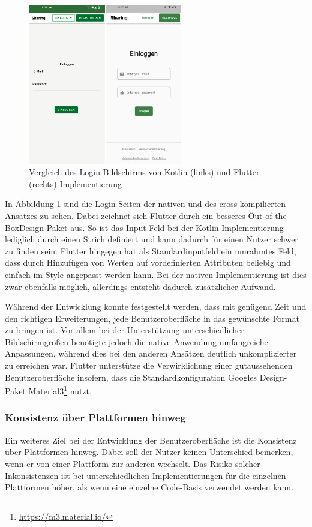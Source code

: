 \begin{figure}[ht]
  \centering
  \includegraphics[height=7cm,keepaspectratio]{images/Login_vergleich.png} 
  \caption[Vergleich des Login-Bildschirms von Kotlin und Flutter Implementierung.]{Vergleich des Login-Bildschirms von Kotlin (links) und Flutter (rechts) Implementierung}
  \label{fig:loginscreen}
\end{figure}

In Abbildung \ref{fig:loginscreen} sind die Login-Seiten der nativen und des cross-kompilierten Ansatzes zu sehen. Dabei zeichnet sich Flutter durch ein besseres \"Out-of-the-Box\" Design-Paket aus. So ist das Input Feld bei der Kotlin Implementierung lediglich durch einen Strich definiert und kann dadurch für einen Nutzer schwer zu finden sein. Flutter hingegen hat als Standardinputfeld ein umrahmtes Feld, dass durch Hinzufügen von Werten auf vordefinierten Attributen beliebig und einfach im Style angepasst werden kann. Bei der nativen Implementierung ist dies zwar ebenfalls möglich, allerdings entsteht dadurch zusätzlicher Aufwand.

Während der Entwicklung konnte festgestellt werden, dass mit genügend Zeit und den richtigen Erweiterungen, jede Benutzeroberfläche in das gewünschte Format zu bringen ist. Vor allem bei der Unterstützung unterschiedlicher Bildschirmgrößen benötigte jedoch die native Anwendung umfangreiche Anpassungen, während dies bei den anderen Ansätzen deutlich unkomplizierter zu erreichen war. Flutter unterstütze die Verwirklichung einer gutaussehenden Benutzeroberfläche insofern, dass die Standardkonfiguration Googles Design-Paket Material3\footnote{\url{https://m3.material.io/}} nutzt.

\subsubsection{Konsistenz über Plattformen hinweg}
Ein weiteres Ziel bei der Entwicklung der Benutzeroberfläche ist die Konsistenz über Plattformen hinweg.
Dabei soll der Nutzer keinen Unterschied bemerken, wenn er von einer Plattform zur anderen wechselt. 
Das Risiko solcher Inkonsistenzen ist bei unterschiedlichen Implementierungen für die einzelnen Plattformen höher, als wenn eine einzelne Code-Basis verwendet werden kann.

